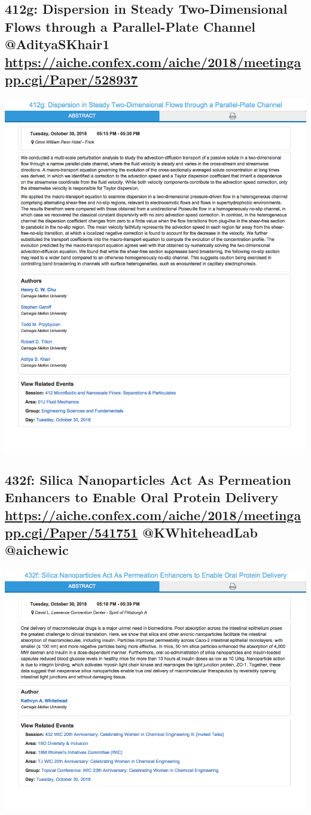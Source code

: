 \documentclass[11pt]{article}
\begin{document}
\subsection{412g: Dispersion in Steady Two-Dimensional Flows through a Parallel-Plate Channel @AdityaSKhair1 \url{https://aiche.confex.com/aiche/2018/meetingapp.cgi/Paper/528937}}
\label{sec:org58e553e}
\begin{center}
\includegraphics[width=.9\linewidth]{./528937.png}
\end{center}

\subsection{432f: Silica Nanoparticles Act As Permeation Enhancers to Enable Oral Protein Delivery \url{https://aiche.confex.com/aiche/2018/meetingapp.cgi/Paper/541751}  @KWhiteheadLab @aichewic}
\label{sec:orgeafd5d3}
\begin{center}
\includegraphics[width=.9\linewidth]{./541751.png}
\end{center}
\end{document}
